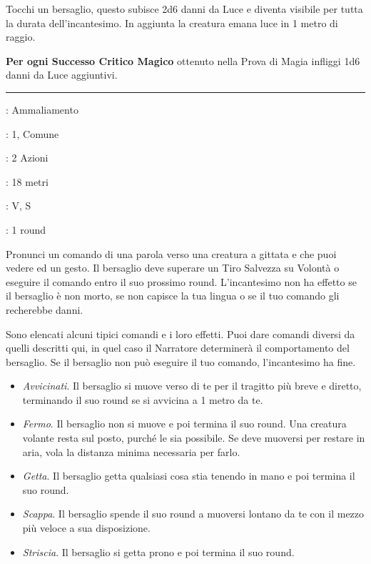 \begin{multicols}{2}
Tocchi un bersaglio, questo subisce 2d6 danni da Luce e diventa visibile per tutta la durata dell'incantesimo. In aggiunta la creatura emana luce in 1 metro di raggio.

\textbf{Per ogni Successo Critico Magico} ottenuto nella Prova di Magia infliggi 1d6 danni da Luce aggiuntivi.

\smallskip\noindent\rule{\linewidth}{2pt} \hypertarget{Comando}{}\smallskip{}
\noindent
\begin{description}[noitemsep, topsep=0pt, parsep=0pt, partopsep=0pt, leftmargin=0cm, labelwidth=2.8cm]
	\item[\textbf{Lista di Magia}]: Ammaliamento
	\item[\textbf{Livello}]: 1, Comune
	\item[\textbf{T. di Lancio}]: 2 Azioni
	\item[\textbf{Gittata}]: 18 metri
	\item[\textbf{Componenti}]: V, S
	\item[\textbf{Durata}]: 1 round
\end{description}

Pronunci un comando di una parola verso una creatura a gittata e che puoi vedere ed un gesto. Il bersaglio deve superare un Tiro Salvezza su Volontà o eseguire il comando entro il suo prossimo round. L'incantesimo non ha effetto se il bersaglio è non morto, se non capisce la tua lingua o se il tuo comando gli recherebbe danni.

Sono elencati alcuni tipici comandi e i loro effetti. Puoi dare comandi diversi da quelli descritti qui, in quel caso il Narratore determinerà il comportamento del bersaglio. Se il bersaglio non può eseguire il tuo comando, l'incantesimo ha fine.

\begin{itemize}[leftmargin=*] \setlength{\itemsep}{0pt}
	\item \emph{Avvicinati}. Il bersaglio si muove verso di te per il tragitto più breve e diretto, terminando il suo round se si avvicina a 1 metro da te.
	\item \emph{Fermo}. Il bersaglio non si muove e poi termina il suo round. Una creatura volante resta sul posto, purché le sia possibile. Se deve muoversi per restare in aria, vola la distanza minima necessaria per farlo.
	\item \emph{Getta}. Il bersaglio getta qualsiasi cosa stia tenendo in mano e poi termina il suo round.
	\item \emph{Scappa}. Il bersaglio spende il suo round a muoversi lontano da te con il mezzo più veloce a sua disposizione.
	\item \emph{Striscia}. Il bersaglio si getta prono e poi termina il suo round.
\end{itemize}


\end{multicols}
